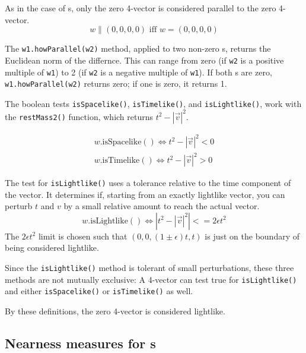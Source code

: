 As in the case of \SV s, only the zero 4-vector is considered parallel to
the zero 4-vector.
\begin{equation}
\label{eq:wisPar:2}
  w \parallel (0, 0, 0, 0) \mbox{ iff } w = (0, 0, 0, 0)
\end{equation}

The {\tt w1.howParallel(w2)} method, applied to two non-zero \LV s,
returns the Euclidean norm of the differnce.  This can range from zero
(if {\tt w2} is a positive multiple of {\tt w1}) to
2 (if {\tt w2} is a negative multiple of {\tt w1}).  If both \LV s are
zero, {\tt w1.howParallel(w2)} returns zero; if one is zero, it returns 1.

\vspace{.25 in}

The boolean tests {\tt isSpacelike()}, {\tt isTimelike()},
and {\tt isLightlike()},
work with the {\tt restMass2()} function, which returns $t^2 - |\vec{v}|^2$.

\begin{eqnarray}
\label{eq:wisSl}
  w\mbox{.isSpacelike}() \Longleftrightarrow t^2 - |\vec{v}|^2 < 0 \\
\label{eq:wisTl}
  w\mbox{.isTimelike}()  \Longleftrightarrow t^2 - |\vec{v}|^2 > 0
\end{eqnarray}

The test for {\tt isLightlike()}
uses a tolerance relative to the time component of the vector.
It determines if, starting from an exactly lightlike vector, you can perturb
$t$ and $v$ by a small relative amount to reach the actual
vector.
\begin{equation}
\label{eq:wisLl}
  w\mbox{.isLightlike}() \Longleftrightarrow
  \left| t^2 - |\vec{v}|^2 \right| <= 2 \epsilon t^2
\end{equation}
\noindent
The $2 \epsilon t^2$ limit is chosen such that $(0, 0, (1\pm\epsilon)t, t)$
is just on the boundary of being considered lightlike.

Since the {\tt isLightlike()} method is tolerant of small perturbations,
these three methods are not mutually exclusive: A 4-vector can test true for
{\tt isLightlike()}
and either {\tt isSpacelike()} or {\tt isTimelike()} as well.

By these definitions, the zero 4-vector is considered lightlike.

\subsection{Nearness measures for \protect\LV s}

